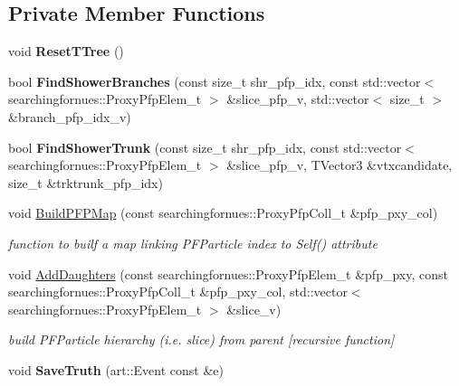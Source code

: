\subsection*{Private Member Functions}
\begin{DoxyCompactItemize}
\item 
void {\bfseries Reset\+T\+Tree} ()\hypertarget{classShowerMerger_a4529aa1606f5db0884cbbf23945ec98a}{}\label{classShowerMerger_a4529aa1606f5db0884cbbf23945ec98a}

\item 
bool {\bfseries Find\+Shower\+Branches} (const size\+\_\+t shr\+\_\+pfp\+\_\+idx, const std\+::vector$<$ searchingfornues\+::\+Proxy\+Pfp\+Elem\+\_\+t $>$ \&slice\+\_\+pfp\+\_\+v, std\+::vector$<$ size\+\_\+t $>$ \&branch\+\_\+pfp\+\_\+idx\+\_\+v)\hypertarget{classShowerMerger_a6fb74d3738dbaf29ebe0257eea8e3c6c}{}\label{classShowerMerger_a6fb74d3738dbaf29ebe0257eea8e3c6c}

\item 
bool {\bfseries Find\+Shower\+Trunk} (const size\+\_\+t shr\+\_\+pfp\+\_\+idx, const std\+::vector$<$ searchingfornues\+::\+Proxy\+Pfp\+Elem\+\_\+t $>$ \&slice\+\_\+pfp\+\_\+v, T\+Vector3 \&vtxcandidate, size\+\_\+t \&trktrunk\+\_\+pfp\+\_\+idx)\hypertarget{classShowerMerger_a559f4ef0334813f609ce0038fc5b273c}{}\label{classShowerMerger_a559f4ef0334813f609ce0038fc5b273c}

\item 
void \hyperlink{classShowerMerger_a9fb233f4aafc287d68e3f80bc5fcf27a}{Build\+P\+F\+P\+Map} (const searchingfornues\+::\+Proxy\+Pfp\+Coll\+\_\+t \&pfp\+\_\+pxy\+\_\+col)
\begin{DoxyCompactList}\small\item\em function to builf a map linking P\+F\+Particle index to Self() attribute \end{DoxyCompactList}\item 
void \hyperlink{classShowerMerger_af7fd315853bd22adcb9a9479706673de}{Add\+Daughters} (const searchingfornues\+::\+Proxy\+Pfp\+Elem\+\_\+t \&pfp\+\_\+pxy, const searchingfornues\+::\+Proxy\+Pfp\+Coll\+\_\+t \&pfp\+\_\+pxy\+\_\+col, std\+::vector$<$ searchingfornues\+::\+Proxy\+Pfp\+Elem\+\_\+t $>$ \&slice\+\_\+v)
\begin{DoxyCompactList}\small\item\em build P\+F\+Particle hierarchy (i.\+e. slice) from parent \mbox{[}recursive function\mbox{]} \end{DoxyCompactList}\item 
void {\bfseries Save\+Truth} (art\+::\+Event const \&e)\hypertarget{classShowerMerger_a2182bc1472f67f60cd02c7546fb0eabd}{}\label{classShowerMerger_a2182bc1472f67f60cd02c7546fb0eabd}

\end{DoxyCompactItemize}
